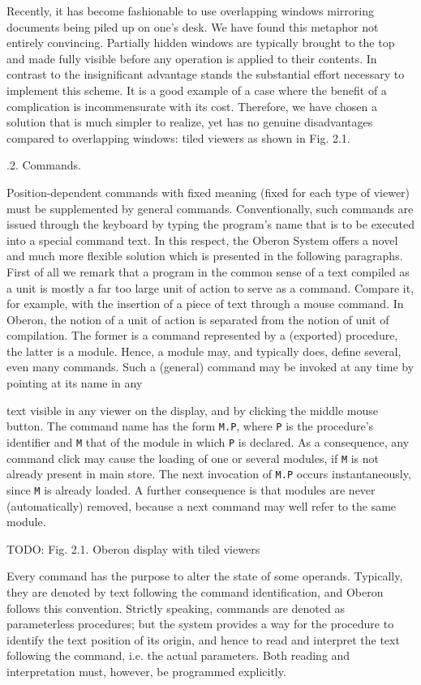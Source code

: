 Recently, it has become fashionable to use overlapping windows
mirroring documents being piled up on one's desk. We have found this
metaphor not entirely convincing. Partially hidden windows are
typically brought to the top and made fully visible before any
operation is applied to their contents. In contrast to the
insignificant advantage stands the substantial effort necessary to
implement this scheme. It is a good example of a case where the
benefit of a complication is incommensurate with its cost. Therefore,
we have chosen a solution that is much simpler to realize, yet has no
genuine disadvantages compared to overlapping windows: tiled viewers
as shown in Fig. 2.1.


.2. Commands.

Position-dependent commands with fixed meaning (fixed
for each type of viewer) must be supplemented by general
commands. Conventionally, such commands are issued through the
keyboard by typing the program's name that is to be executed into a
special command text. In this respect, the Oberon System offers a
novel and much more flexible solution which is presented in the
following paragraphs.  First of all we remark that a program in the
common sense of a text compiled as a unit is mostly a far too large
unit of action to serve as a command. Compare it, for example, with
the insertion of a piece of text through a mouse command. In Oberon,
the notion of a unit of action is separated from the notion of unit of
compilation. The former is a command represented by a (exported)
procedure, the latter is a module. Hence, a module may, and typically
does, define several, even many commands. Such a (general) command may
be invoked at any time by pointing at its name in any

text visible in any viewer on the display, and by clicking the middle
mouse button. The command name has the form {\tt M.P}, where {\tt P} is the
procedure's identifier and {\tt M} that of the module in which {\tt P} is
declared. As a consequence, any command click may cause the loading of
one or several modules, if {\tt M} is not already present in main store. The
next invocation of {\tt M.P} occurs instantaneously, since {\tt M} is already
loaded. A further consequence is that modules are never
(automatically) removed, because a next command may well refer to the
same module.

TODO: Fig. 2.1. Oberon display with tiled viewers

Every command has the purpose to alter the state of some
operands. Typically, they are denoted by text following the command
identification, and Oberon follows this convention. Strictly speaking,
commands are denoted as parameterless procedures; but the system
provides a way for the procedure to identify the text position of its
origin, and hence to read and interpret the text following the
command, i.e. the actual parameters. Both reading and interpretation
must, however, be programmed explicitly.

